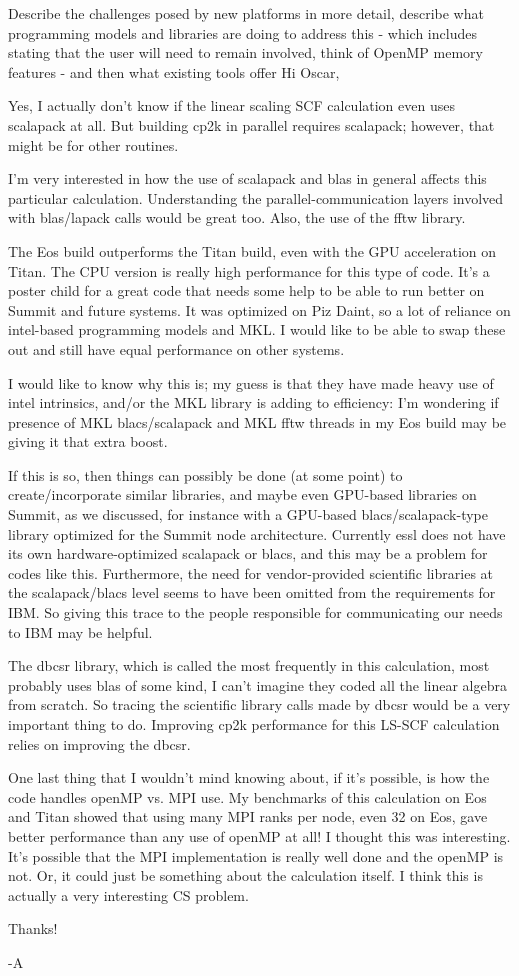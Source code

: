 Describe the challenges posed by new platforms in more detail, describe what programming models and libraries are doing to address this - which includes stating that the user will need to remain involved, think of OpenMP memory features - and then what existing tools offer
Hi Oscar,

Yes, I actually don't know if the linear scaling SCF calculation even uses scalapack at all. But building cp2k in parallel requires scalapack; however, that might be for other routines. 

I'm very interested in how the use of scalapack and blas in general affects this particular calculation. Understanding the parallel-communication layers involved with blas/lapack calls would be great too. Also, the use of the fftw library.

The Eos build outperforms the Titan build, even with the GPU acceleration on Titan. The CPU version is really high performance for this type of code. It's a poster child for a great code that needs some help to be able to run better on Summit and future systems. It was optimized on Piz Daint, so a lot of reliance on intel-based programming models and MKL. I would like to be able to swap these out and still have equal performance on other systems.

I would like to know why this is; my guess is that they have made heavy use of intel intrinsics, and/or the MKL library is adding to efficiency: I'm wondering if presence of MKL blacs/scalapack and MKL fftw threads in my Eos build may be giving it that extra boost. 

If this is so, then things can possibly be done (at some point) to create/incorporate similar libraries, and maybe even GPU-based libraries on Summit, as we discussed, for instance with a GPU-based blacs/scalapack-type library optimized for the Summit node architecture. Currently essl does not have its own hardware-optimized scalapack or blacs, and this may be a problem for codes like this. Furthermore, the need for vendor-provided scientific libraries at the scalapack/blacs level seems to have been omitted from the requirements for IBM. So giving this trace to the people responsible for communicating our needs to IBM may be helpful.

The dbcsr library, which is called the most frequently in this calculation, most probably uses blas of some kind, I can't imagine they coded all the linear algebra from scratch. So tracing the scientific library calls made by dbcsr would be a very important thing to do. Improving cp2k performance for this LS-SCF calculation relies on improving the dbcsr.

One last thing that I wouldn't mind knowing about, if it's possible, is how the code handles openMP vs. MPI use. My benchmarks of this calculation on Eos and Titan showed that using many MPI ranks per node, even 32 on Eos, gave better performance than any use of openMP at all! I thought this was interesting. It's possible that the MPI implementation is really well done and the openMP is not. Or, it could just be something about the calculation itself. I think this is actually a very interesting CS problem.

Thanks!

-A
